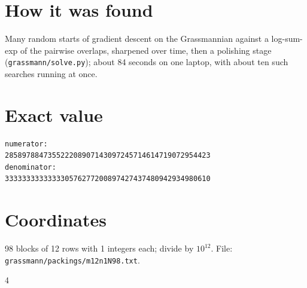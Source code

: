 \documentclass[11pt,a4paper]{article}
\begin{document}
\section{How it was found}
Many random starts of gradient descent on the Grassmannian against a log-sum-exp of the pairwise overlaps, sharpened over time, then a polishing stage (\texttt{grassmann/solve.py}); about 84 seconds on one laptop, with about ten such searches running at once.


\appendix
\section{Exact value}
{\small
\begin{verbatim}
numerator:
285897884735522208907143097245714614719072954423
denominator:
333333333333330576277200897427437480942934980610
\end{verbatim}}

\section{Coordinates}
98 blocks of 12 rows with 1 integers each; divide by $10^{12}$. File: \texttt{grassmann/packings/m12n1N98.txt}.
{\tiny
\begin{multicols}{4}
\end{multicols}}
\end{document}
